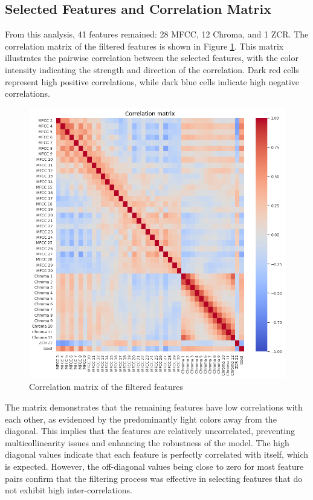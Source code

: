 \subsection{Selected Features and Correlation Matrix}

From this analysis, 41 features remained: 28 MFCC, 12 Chroma, and 1 ZCR.
The correlation matrix of the filtered features is shown in Figure \ref{fig:correlation_matrix}.
This matrix illustrates the pairwise correlation between the selected features, with the color intensity
indicating the strength and direction of the correlation. Dark red cells represent high positive correlations,
while dark blue cells indicate high negative correlations.

\begin{figure}[H]
    \centering
    \includegraphics[width=0.8\columnwidth]{../images/correlation_matrix.png}
    \caption{Correlation matrix of the filtered features}
    \label{fig:correlation_matrix}
\end{figure}
\noindent
The matrix demonstrates that the remaining features have low correlations with each other, as evidenced by the predominantly
light colors away from the diagonal. This implies that the features are relatively uncorrelated, preventing multicollinearity
issues and enhancing the robustness of the model. The high diagonal values indicate that each feature is perfectly correlated
with itself, which is expected. However, the off-diagonal values being close to zero for most feature pairs confirm that the filtering
process was effective in selecting features that do not exhibit high inter-correlations.
